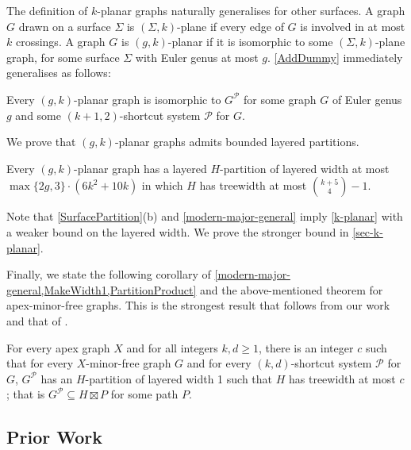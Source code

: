 \documentclass{patmorin}
\newcommand{\PP}{\mathcal{P}}
\renewcommand{\geq}{\geqslant}
\begin{document}
The definition of $k$-planar graphs naturally generalises for other surfaces. A graph $G$ drawn on a surface $\Sigma$ is $(\Sigma,k)$-plane if every edge of $G$ is involved in at most $k$ crossings.  A graph $G$ is $(g,k)$-planar if it is isomorphic to some $(\Sigma,k)$-plane graph, for some surface $\Sigma$ with Euler genus at most $g$. 
\cref{AddDummy} immediately generalises as follows:

\begin{obs}
\label{gAddDummy}
Every $(g,k)$-planar graph is isomorphic to $G^\PP$ for some graph $G$ of Euler genus $g$ and some $(k+1,2)$-shortcut system $\PP$ for $G$. 
\end{obs}

We prove that $(g,k)$-planar graphs admits bounded layered partitions. 

\begin{thm}
\label{g-k-planar}
Every $(g,k)$-planar graph has a layered $H$-partition of layered width at most 
$\max\{2g,3\}\cdot(6k^2 + 10k)$ in which $H$ has treewidth at most $\binom{k+5}{4}-1$.
\end{thm}

Note that \cref{SurfacePartition}(b) and \cref{modern-major-general} imply \cref{k-planar} with a weaker bound on the layered width. We prove the stronger bound in \cref{sec-k-planar}. 

Finally, we state the following corollary of \cref{modern-major-general,MakeWidth1,PartitionProduct} and the above-mentioned theorem for apex-minor-free graphs.  This is the strongest result that follows from our work and that of \citet{dujmovic.joret.ea:planar}. 

\begin{thm}
For every apex graph $X$ and for all integers $k,d\geq 1$, there is an integer $c$ such that for every $X$-minor-free graph $G$ and for every $(k,d)$-shortcut system $\PP$ for $G$,  $G^\PP$ has an $H$-partition of layered width 1 such that $H$ has treewidth at most $c$; that is $G^\PP \subseteq H \boxtimes P$ for some path $P$. 
\end{thm}

\subsection{Prior Work}
\label{PriorWork}
\end{document}
